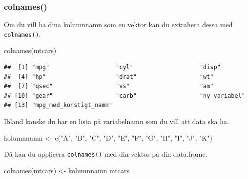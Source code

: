 \documentclass[
]{book}
\newenvironment{Shaded}{\begin{snugshade}}{\end{snugshade}}
\newcommand{\FunctionTok}[1]{\textcolor[rgb]{0.00,0.00,0.00}{#1}}
\newcommand{\NormalTok}[1]{#1}
\newcommand{\OtherTok}[1]{\textcolor[rgb]{0.56,0.35,0.01}{#1}}
\newcommand{\SpecialCharTok}[1]{\textcolor[rgb]{0.00,0.00,0.00}{#1}}
\newcommand{\StringTok}[1]{\textcolor[rgb]{0.31,0.60,0.02}{#1}}
\begin{document}
\begin{Shaded}
\end{Shaded}

\hypertarget{colnames}{%
\subsubsection{colnames()}\label{colnames}}

Om du vill ha dina kolumnnamn som en vektor kan du extrahera dessa med \texttt{colnames()}.

\begin{Shaded}
\begin{Highlighting}[]
\FunctionTok{colnames}\NormalTok{(mtcars)}
\end{Highlighting}
\end{Shaded}

\begin{verbatim}
##  [1] "mpg"                   "cyl"                   "disp"                 
##  [4] "hp"                    "drat"                  "wt"                   
##  [7] "qsec"                  "vs"                    "am"                   
## [10] "gear"                  "carb"                  "ny_variabel"          
## [13] "mpg_med_konstigt_namn"
\end{verbatim}

Ibland kanske du har en lista på variabelnamn som du vill att data ska ha.

\begin{Shaded}
\begin{Highlighting}[]
\NormalTok{kolumnnamn }\OtherTok{\textless{}{-}} \FunctionTok{c}\NormalTok{(}\StringTok{"A"}\NormalTok{, }\StringTok{"B"}\NormalTok{, }\StringTok{"C"}\NormalTok{, }\StringTok{"D"}\NormalTok{, }\StringTok{"E"}\NormalTok{, }\StringTok{"F"}\NormalTok{, }\StringTok{"G"}\NormalTok{, }\StringTok{"H"}\NormalTok{, }\StringTok{"I"}\NormalTok{, }\StringTok{"J"}\NormalTok{, }\StringTok{"K"}\NormalTok{)}
\end{Highlighting}
\end{Shaded}

Då kan du applicera \texttt{colnames()} med din vektor på din data.frame.

\begin{Shaded}
\begin{Highlighting}[]
\FunctionTok{colnames}\NormalTok{(mtcars) }\OtherTok{\textless{}{-}}\NormalTok{ kolumnnamn}
\NormalTok{mtcars}
\end{Highlighting}
\end{Shaded}
\end{document}
